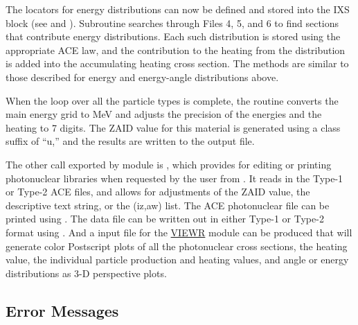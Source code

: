 The locators for energy distributions can now be defined and stored into
the IXS block (see  and ).  Subroutine
 searches through Files 4, 5, and 6 to find sections that
contribute energy distributions.  Each such distribution is stored
using the appropriate ACE law, and the contribution to the heating
from the distribution is added into the accumulating heating cross
section.  The methods are similar to those described for energy
and energy-angle distributions above.

When the loop over all the particle types is complete, the routine
converts the main energy grid to MeV and adjusts the precision of
the energies and the heating to 7 digits.  The ZAID value for this
material is generated using a class suffix of ``u,'' and the
results are written to the output file.

The other call exported by module  is
, which provides
for editing or printing photonuclear libraries when
requested by the user from .  It reads in the Type-1
or Type-2 ACE files, and allows for adjustments of the ZAID value,
the descriptive text string, or the (iz,aw) list.  The ACE photonuclear
file can be printed using .  The data file can be
written out in either Type-1 or Type-2 format using .
And a input file for the \hyperlink{sVIEWRhy}{VIEWR}
module can be produced
that will generate color Postscript plots of all the photonuclear
cross sections, the heating value, the individual particle production
and heating values, and angle or energy distributions as
3-D perspective plots.


\subsection{Error Messages}
\label{ssACER_msg}

